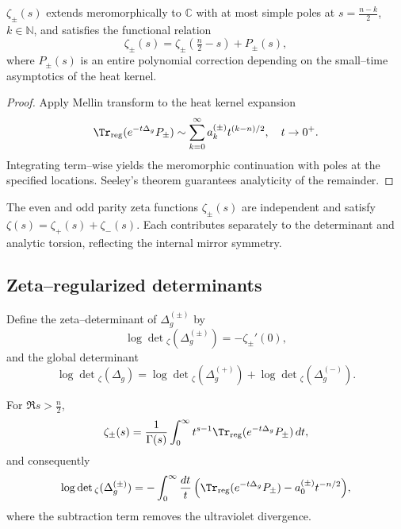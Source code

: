 \begin{lemma}
\label{lem:zeta-meromorphic}
$\zeta_\pm(s)$ extends meromorphically to $\mathbb{C}$ with at most simple poles at $s=\tfrac{n-k}{2}$, $k\in\mathbb{N}$, and satisfies the functional relation
\[
\zeta_\pm(s)
=\zeta_\pm(\tfrac{n}{2}-s)+P_\pm(s),
\]
where $P_\pm(s)$ is an entire polynomial correction depending on the small–time asymptotics of the heat kernel. %
\end{lemma}

\begin{proof}
Apply Mellin transform to the heat kernel expansion
\[
\Tr_{\mathrm{reg}}(e^{-t\Delta_g}P_\pm)
\sim\sum_{k=0}^\infty a_k^{(\pm)}t^{(k-n)/2}, \quad t\to0^+.
\]
Integrating term–wise yields the meromorphic continuation with poles at the specified locations.  
Seeley’s theorem guarantees analyticity of the remainder. %
\end{proof}

\begin{remark}
\label{rem:parity-split-zeta}
The even and odd parity zeta functions $\zeta_\pm(s)$ are independent and satisfy $\zeta(s)=\zeta_+(s)+\zeta_-(s)$.  
Each contributes separately to the determinant and analytic torsion, reflecting the internal mirror symmetry. %
\end{remark}

\subsection{Zeta–regularized determinants}
\label{subsec:ch6-part6-determinant} \relax

\begin{definition}
\label{def:zeta-determinant}
Define the zeta–determinant of $\Delta_g^{(\pm)}$ by
\[
\log\det{}_{\zeta}(\Delta_g^{(\pm)})
=-\zeta_\pm'(0),
\]
and the global determinant
\[
\log\det{}_{\zeta}(\Delta_g)
=\log\det{}_{\zeta}(\Delta_g^{(+)})
+\log\det{}_{\zeta}(\Delta_g^{(-)}).
\] %
\end{definition}

\begin{lemma}
\label{lem:heat-representation}
For $\Re s>\frac{n}{2}$,
\[
\zeta_\pm(s)
=\frac{1}{\Gamma(s)}\int_0^\infty t^{s-1}\Tr_{\mathrm{reg}}(e^{-t\Delta_g}P_\pm)\,dt,
\]
and consequently
\[
\log\det{}_{\zeta}(\Delta_g^{(\pm)})
=-\int_0^\infty \frac{dt}{t}\,
\Big(\Tr_{\mathrm{reg}}(e^{-t\Delta_g}P_\pm)-a_0^{(\pm)}t^{-n/2}\Big),
\]
where the subtraction term removes the ultraviolet divergence. %
\end{lemma}

